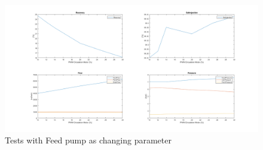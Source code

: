 \begin{figure}[h]
    \centering 
    \includegraphics[width=1.65\textwidth, angle=270]{PreTestReg3.png}
    \caption{Tests with Feed pump as changing parameter}
    \label{fig:PreTestReg3}
\end{figure}





